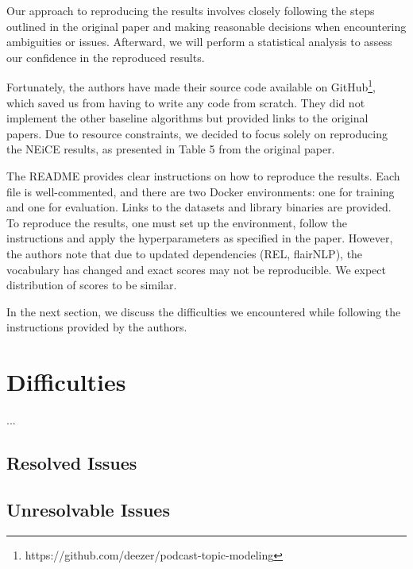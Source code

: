\documentclass[manuscript]{acmart}
\begin{document}

Our approach to reproducing the results involves closely following the steps outlined in the original paper and making reasonable decisions when encountering ambiguities or issues. Afterward, we will perform a statistical analysis to assess our confidence in the reproduced results.

Fortunately, the authors have made their source code available on GitHub\footnote{https://github.com/deezer/podcast-topic-modeling}, which saved us from having to write any code from scratch. They did not implement the other baseline algorithms but provided links to the original papers. Due to resource constraints, we decided to focus solely on reproducing the NEiCE results, as presented in Table 5 from the original paper.

The README provides clear instructions on how to reproduce the results. Each file is well-commented, and there are two Docker environments: one for training and one for evaluation. Links to the datasets and library binaries are provided. To reproduce the results, one must set up the environment, follow the instructions and apply the hyperparameters as specified in the paper. However, the authors note that due to updated dependencies (REL, flairNLP), the vocabulary has changed and exact scores may not be reproducible. We expect distribution of scores to be similar.

In the next section, we discuss the difficulties we encountered while following the instructions provided by the authors.

\section{Difficulties}

...

\subsection{Resolved Issues}

\subsection{Unresolvable Issues}



\end{document}
